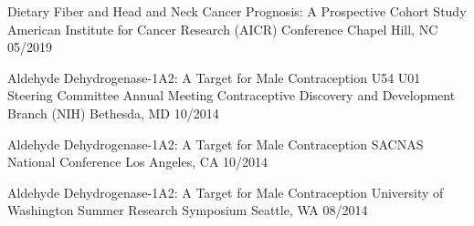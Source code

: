 




\begin{cvhonors}

  \cvhonor
    {Dietary Fiber and Head and Neck Cancer Prognosis: A Prospective Cohort Study} %
    {American Institute for Cancer Research (AICR) Conference} %
    {Chapel Hill, NC} %
    {05/2019} %

  \cvhonor
    {Aldehyde Dehydrogenase-1A2: A Target for Male Contraception} %
    {U54 U01 Steering Committee Annual Meeting 
Contraceptive Discovery and Development Branch (NIH)} %
    {Bethesda, MD} %
    {10/2014} %
    
  \cvhonor
    {Aldehyde Dehydrogenase-1A2: A Target for Male Contraception} %
    {SACNAS National Conference} %
    {Los Angeles, CA} %
    {10/2014} %
    
  \cvhonor
    {Aldehyde Dehydrogenase-1A2: A Target for Male Contraception} %
    {University of Washington Summer Research Symposium} %
    {Seattle, WA }%
    {08/2014} %

\end{cvhonors}


